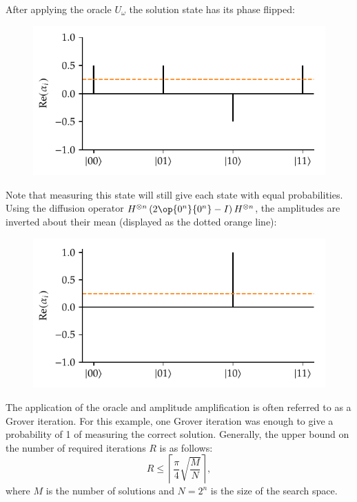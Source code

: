 \noindent
After applying the oracle $U_\omega$ the solution state  has its phase flipped:
\begin{figure}[H]
    \centering
    \includegraphics[width=0.45\linewidth]{figures/aa_phase_flipped_mean.pdf}
\end{figure}

\noindent
Note that measuring this state will still give each state with equal probabilities.
Using the diffusion operator $H^{\otimes n}\left(2\op{0^n}{0^n} - I\right)H^{\otimes n}$, the amplitudes are inverted about their mean (displayed as the dotted orange line):
\begin{figure}[H]
    \centering
    \includegraphics[width=0.45\linewidth]{figures/aa_diffused.pdf}
\end{figure}

\noindent
The application of the oracle and amplitude amplification is often referred to as a Grover iteration.
For this example, one Grover iteration was enough to give a probability of 1 of measuring the correct solution.
Generally, the upper bound on the number of required iterations $R$ is as follows:
\begin{equation}
R \leq \left\lceil \dfrac{\pi}{4}\sqrt{\dfrac{M}{N}} \right\rceil,
\end{equation}
where $M$ is the number of solutions and $N = 2^n$ is the size of the search space.
